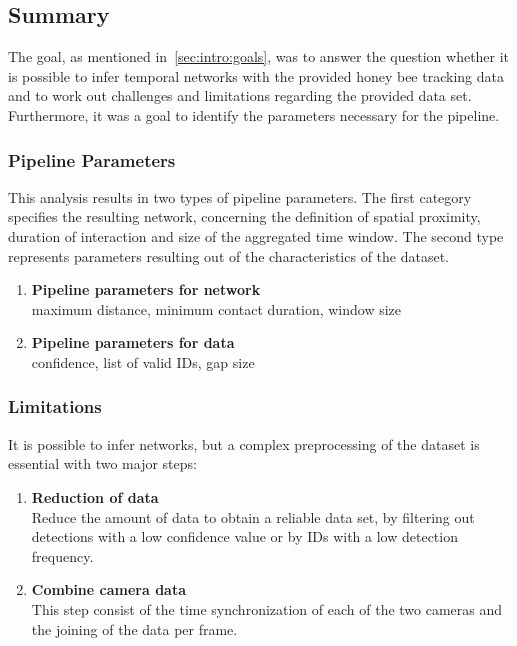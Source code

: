 \subsection{Summary}
The goal, as mentioned in~\ref{sec:intro:goals}, was to answer the question whether it is possible to infer temporal networks with the provided honey bee tracking data and to work out challenges and limitations regarding the provided data set. Furthermore, it was a goal to identify the parameters necessary for the pipeline.

\subsubsection{Pipeline Parameters}
This analysis results in two types of pipeline parameters. The first category specifies the resulting network, concerning the definition of spatial proximity, duration of interaction and size of the aggregated time window. The second type represents parameters resulting out of the characteristics of the dataset.

\begin{enumerate}
\item \textbf{Pipeline parameters for network}\\
maximum distance, minimum contact duration, window size
\item \textbf{Pipeline parameters for data}\\
confidence, list of valid IDs, gap size
\end{enumerate}


\subsubsection{Limitations}
It is possible to infer networks, but a complex preprocessing of the dataset is essential with two major steps:

\begin{enumerate}
\item \textbf{Reduction of data}\\
Reduce the amount of data to obtain a reliable data set, by filtering out detections with a low confidence value or by IDs with a low detection frequency.
\item \textbf{Combine camera data}\\
This step consist of the time synchronization of each of the two cameras and the joining of the data per frame.
\end{enumerate}


